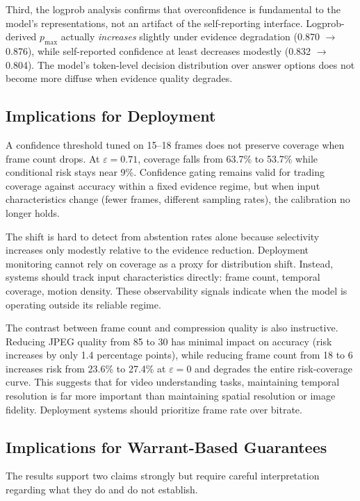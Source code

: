 \documentclass{article}
\begin{document}
Third, the logprob analysis confirms that overconfidence is fundamental to the model's representations, not an artifact of the self-reporting interface. Logprob-derived $p_{\max}$ actually \emph{increases} slightly under evidence degradation (0.870 $\to$ 0.876), while self-reported confidence at least decreases modestly (0.832 $\to$ 0.804). The model's token-level decision distribution over answer options does not become more diffuse when evidence quality degrades.

\subsection{Implications for Deployment}

A confidence threshold tuned on 15--18 frames does not preserve coverage when frame count drops. At $\varepsilon=0.71$, coverage falls from 63.7\% to 53.7\% while conditional risk stays near 9\%. Confidence gating remains valid for trading coverage against accuracy within a fixed evidence regime, but when input characteristics change (fewer frames, different sampling rates), the calibration no longer holds.

The shift is hard to detect from abstention rates alone because selectivity increases only modestly relative to the evidence reduction. Deployment monitoring cannot rely on coverage as a proxy for distribution shift. Instead, systems should track input characteristics directly: frame count, temporal coverage, motion density. These observability signals indicate when the model is operating outside its reliable regime.

The contrast between frame count and compression quality is also instructive. Reducing JPEG quality from 85 to 30 has minimal impact on accuracy (risk increases by only 1.4 percentage points), while reducing frame count from 18 to 6 increases risk from 23.6\% to 27.4\% at $\varepsilon=0$ and degrades the entire risk-coverage curve. This suggests that for video understanding tasks, maintaining temporal resolution is far more important than maintaining spatial resolution or image fidelity. Deployment systems should prioritize frame rate over bitrate.

\subsection{Implications for Warrant-Based Guarantees}

The results support two claims strongly but require careful interpretation regarding what they do and do not establish.
\end{document}
